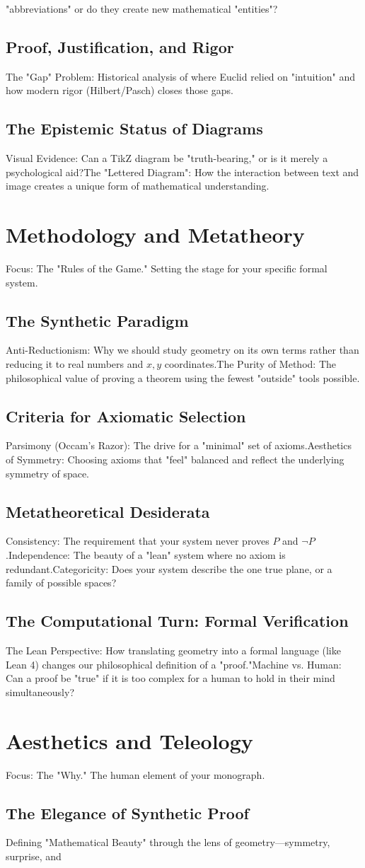 \documentclass{book}
\begin{document}
"abbreviations" or do they create new mathematical "entities"?\section{Proof, Justification, and Rigor}The "Gap" Problem: Historical analysis of where Euclid relied on "intuition" and how modern rigor (Hilbert/Pasch) closes those gaps.\section{The Epistemic Status of Diagrams}Visual Evidence: Can a TikZ diagram be "truth-bearing," or is it merely a psychological aid?The "Lettered Diagram": How the interaction between text and image creates a unique form of mathematical understanding.\chapter{Methodology and Metatheory}Focus: The "Rules of the Game." Setting the stage for your specific formal system.\section{The Synthetic Paradigm}Anti-Reductionism: Why we should study geometry on its own terms rather than reducing it to real numbers and $x, y$ coordinates.The Purity of Method: The philosophical value of proving a theorem using the fewest "outside" tools possible.\section{Criteria for Axiomatic Selection}Parsimony (Occam’s Razor): The drive for a "minimal" set of axioms.Aesthetics of Symmetry: Choosing axioms that "feel" balanced and reflect the underlying symmetry of space.\section{Metatheoretical Desiderata}Consistency: The requirement that your system never proves $P$ and $\neg P$.Independence: The beauty of a "lean" system where no axiom is redundant.Categoricity: Does your system describe the one true plane, or a family of possible spaces?\section{The Computational Turn: Formal Verification}The Lean Perspective: How translating geometry into a formal language (like Lean 4) changes our philosophical definition of a "proof."Machine vs. Human: Can a proof be "true" if it is too complex for a human to hold in their mind simultaneously?\chapter{Aesthetics and Teleology}Focus: The "Why." The human element of your monograph.\section{The Elegance of Synthetic Proof}Defining "Mathematical Beauty" through the lens of geometry—symmetry, surprise, and 
\end{document}
